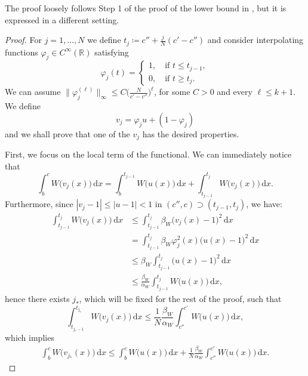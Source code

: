 \documentclass{article}
\theoremstyle{definition}
\newcommand{\de}{\mathrm{d}}
\newcommand{\R}{\mathbb{R}}
\let\phi\varphi
\let\l\ell
\begin{document}
The proof loosely follows Step 1 of the proof of the lower bound in \cite{Solci_2024}, but it is expressed in a different setting.
\begin{proof} 

For $j=1,\ldots, N$ we define $t_j\coloneqq c''+\frac{j}{N}(c'-c'')$ and consider interpolating functions $\phi_j\in C^\infty(\R)$ satisfying
    \begin{equation*}
          \phi_j(t)=
    \begin{cases}
    1 ,\quad \text{if }   t\leq t_{j-1},
    \\
    0 ,\quad \text{if } t\ge t_j.
    \end{cases}
    \end{equation*}
    We can assume $\|\phi_j^{(\l)}\|_\infty\leq C \big(\frac{N}{c'-c''}\big)^\l$, for some $C>0$ and every $\ell\leq k+1$. We define 
    \begin{equation*}
        v_j=\phi_ju+(1-\phi_j)
    \end{equation*}
    and we shall prove that one of the $v_j$ has the desired properties. 
    
    First, we focus on the local term of the functional. We can immediately notice that 
    \[\int_b^c W\big(v_j(x)\big)\,\de x = \int_b^{t_{j-1}}W\big(u(x)\big)\,\de x + \int_{t_{j-1}}^{t_j}W\big(v_j(x)\big)\,\de x.\]
    Furthermore, since $|v_j-1| \leq |u-1|<1$ in $(c'',c)\supset (t_{j-1},t_j)$, we have: 
    \begin{align*}
    \int_{t_{j-1}}^{t_j}W\big(v_j(x)\big)\,\de x &\leq \int_{t_{j-1}}^{t_j}\beta_W\big(v_j(x)-1\big)^2\,\de x \\
    &= \int_{t_{j-1}}^{t_j}\beta_W\phi_j^2(x)\big(u(x)-1\big)^2\,\de x \\ 
    &\leq \beta_W  \int_{t_{j-1}}^{t_j}\big(u(x)-1\big)^2\,\de x \\
    &\leq \frac{\beta_W}{\alpha_W}\int_{t_{j-1}}^{t_j}W\big(u(x)\big)\,\de x,
\end{align*}
hence there exists $j_*$, which will be fixed for the rest of the proof, such that
\begin{equation*}
    \int_{t_{j_*-1}}^{t_{j_*}}W\big(v_j(x)\big)\,\de x \leq \frac{1}{N} \frac{\beta_W}{\alpha_W}\int_{c''}^{c'}W\big(u(x)\big)\,\de x,
\end{equation*}
which implies
\begin{equation}
\label{flattening est loc term}
    \begin{split}
        \int_{b}^c W\big(v_{j_*}(x)\big)\,\de x \leq \int_{b}^c  W\big(u(x)\big)\,\de x + \frac{1}{N}\frac{\beta_W}{\alpha_W} \int_{c''}^{c'} W\big(u(x)\big)\,\de x.
    \end{split}
\end{equation}


\end{proof}
\end{document}
